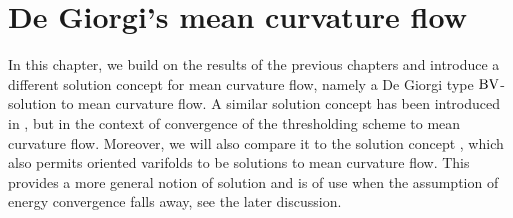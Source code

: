 \chapter{De Giorgi's mean curvature flow}
\label{chapter_de_giorgis_mcf}

In this chapter, we build on the results of the previous chapters and introduce 
a different solution concept for mean curvature flow, namely a De Giorgi type $ 
\operatorname{BV} 
$-solution to mean curvature flow. A similar solution concept has been 
introduced in 
\cite[Def.~1]{laux_lelmi_de_giorgis_inequality_for_the_threshholding_scheme}, 
but in the context of convergence of the thresholding scheme to mean curvature 
flow. Moreover, we will also compare it to the solution concept 
\cite[Def.~1]{hensel_laux_varifold_solution_concept_for_mean_curvature_flow}, 
which also permits oriented varifolds to be solutions to mean curvature flow. 
This provides a more general notion of solution and is of use when the 
assumption of energy convergence falls away, see the later discussion.





